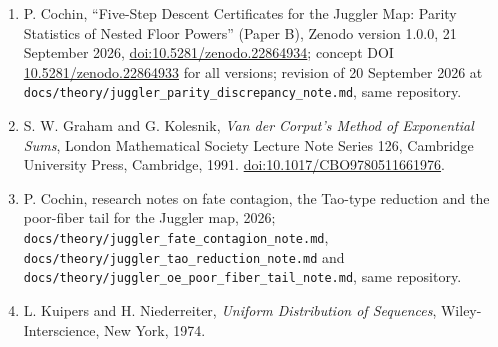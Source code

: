 \documentclass[11pt,a4paper]{article}
\begin{document}
\begin{enumerate}
  (Paper A), Zenodo version 1.0.2, 20 September 2026,
  \href{https://doi.org/10.5281/zenodo.22865237}{doi:10.5281/zenodo.22865237};
  concept DOI
  \href{https://doi.org/10.5281/zenodo.22676452}{10.5281/zenodo.22676452}
  for all versions; revision of 21 September 2026 at
  \texttt{\nolinkurl{docs/theory/juggler_finite_dynamics_note.md}} in
  the repository \url{https://github.com/sneakyweasel/btlab/}.
\item
  P. Cochin, ``Five-Step Descent Certificates for the Juggler Map:
  Parity Statistics of Nested Floor Powers'' (Paper B), Zenodo version
  1.0.0, 21 September 2026,
  \href{https://doi.org/10.5281/zenodo.22864934}{doi:10.5281/zenodo.22864934};
  concept DOI
  \href{https://doi.org/10.5281/zenodo.22864933}{10.5281/zenodo.22864933}
  for all versions; revision of 20 September 2026 at
  \texttt{\nolinkurl{docs/theory/juggler_parity_discrepancy_note.md}},
  same repository.
\item
  S. W. Graham and G. Kolesnik, \emph{Van der Corput's Method of
  Exponential Sums}, London Mathematical Society Lecture Note Series
  126, Cambridge University Press, Cambridge, 1991.
  \href{https://doi.org/10.1017/CBO9780511661976}{doi:10.1017/CBO9780511661976}.
\item
  P. Cochin, research notes on fate contagion, the Tao-type reduction
  and the poor-fiber tail for the Juggler map, 2026;
  \texttt{\nolinkurl{docs/theory/juggler_fate_contagion_note.md}},
  \texttt{\nolinkurl{docs/theory/juggler_tao_reduction_note.md}} and
  \texttt{\nolinkurl{docs/theory/juggler_oe_poor_fiber_tail_note.md}},
  same repository.
\item
  L. Kuipers and H. Niederreiter, \emph{Uniform Distribution of
  Sequences}, Wiley-Interscience, New York, 1974.
\end{enumerate}

\endgroup
\end{document}
